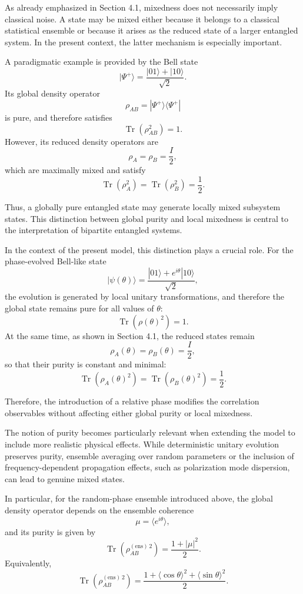 \documentclass[a4paper]{article}
\begin{document}
\medskip

As already emphasized in Section 4.1, mixedness does not necessarily imply classical noise. A state may be mixed either because it belongs to a classical statistical ensemble or because it arises as the reduced state of a larger entangled system. In the present context, the latter mechanism is especially important.

A paradigmatic example is provided by the Bell state
\[
|\Psi^+\rangle = \frac{|01\rangle + |10\rangle}{\sqrt{2}}.
\]
Its global density operator
\[
\rho_{AB} = |\Psi^+\rangle \langle \Psi^+|
\]
is pure, and therefore satisfies
\[
\operatorname{Tr}(\rho_{AB}^2) = 1.
\]
However, its reduced density operators are
\[
\rho_A = \rho_B = \frac{I}{2},
\]
which are maximally mixed and satisfy
\[
\operatorname{Tr}(\rho_A^2) = \operatorname{Tr}(\rho_B^2) = \frac{1}{2}.
\]

Thus, a globally pure entangled state may generate locally mixed subsystem states. This distinction between global purity and local mixedness is central to the interpretation of bipartite entangled systems.

\medskip

In the context of the present model, this distinction plays a crucial role. For the phase-evolved Bell-like state
\[
|\psi(\theta)\rangle = \frac{|01\rangle + e^{i\theta}|10\rangle}{\sqrt{2}},
\]
the evolution is generated by local unitary transformations, and therefore the global state remains pure for all values of $\theta$:
\[
\operatorname{Tr}(\rho(\theta)^2) = 1.
\]
At the same time, as shown in Section 4.1, the reduced states remain
\[
\rho_A(\theta) = \rho_B(\theta) = \frac{I}{2},
\]
so that their purity is constant and minimal:
\[
\operatorname{Tr}(\rho_A(\theta)^2) = \operatorname{Tr}(\rho_B(\theta)^2) = \frac{1}{2}.
\]

Therefore, the introduction of a relative phase modifies the correlation observables without affecting either global purity or local mixedness.

\medskip

The notion of purity becomes particularly relevant when extending the model to include more realistic physical effects. 
While deterministic unitary evolution preserves purity, ensemble averaging over random parameters or the inclusion of frequency-dependent propagation effects, such as polarization mode dispersion, can lead to genuine mixed states. 

In particular, for the random-phase ensemble introduced above, the global density operator depends on the ensemble coherence
\[
\mu = \langle e^{i\theta} \rangle,
\]
and its purity is given by
\[
\operatorname{Tr}(\rho_{AB}^{(\mathrm{ens})\,2})
=
\frac{1 + |\mu|^2}{2}.
\]
Equivalently,
\[
\operatorname{Tr}(\rho_{AB}^{(\mathrm{ens})\,2})
=
\frac{1 + \langle \cos\theta \rangle^2 + \langle \sin\theta \rangle^2}{2}.
\]
\end{document}
